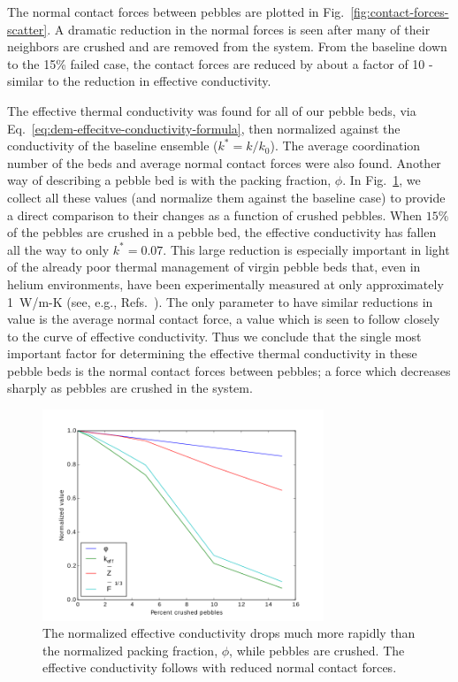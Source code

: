 The normal contact forces between pebbles are plotted in Fig.~\ref{fig:contact-forces-scatter}. A dramatic reduction in the normal forces is seen after many of their neighbors are crushed and are removed from the system. From the baseline down to the 15\% failed case, the contact forces are reduced by about a factor of 10 - similar to the reduction in effective conductivity.

The effective thermal conductivity was found for all of our pebble beds, via Eq.~\ref{eq:dem-effecitve-conductivity-formula}, then normalized against the conductivity of the baseline ensemble ($k^* = k/k_\text{0}$). The average coordination number of the beds and average normal contact forces were also found. Another way of describing a pebble bed is with the packing fraction, $\phi$. In Fig.~\ref{fig:packing-fraction}, we collect all these values (and normalize them against the baseline case) to provide a direct comparison to their changes as a function of crushed pebbles. When $15\%$ of the pebbles are crushed in a pebble bed, the effective conductivity has fallen all the way to only $k^*=0.07$. This large reduction is especially important in light of the already poor thermal management of virgin pebble beds that, even in helium environments, have been experimentally measured at only approximately 1~W/m-K (see, { e.g.}, Refs.~\cite{Reimann:2002mi, Piazza2002811}). The only parameter to have similar reductions in value is the average normal contact force, a value which is seen to follow closely to the curve of effective conductivity. Thus we conclude that the single most important factor for determining the effective thermal conductivity in these pebble beds is the normal contact forces between pebbles; a force which decreases sharply as pebbles are crushed in the system.

\begin{figure}[!ht]
	\centering
	\includegraphics[width=0.75\textwidth]{chapters/figures/kEff_packingFraction}
	\caption{The normalized effective conductivity drops much more rapidly than the normalized packing fraction, $\phi$, while pebbles are crushed. The effective conductivity follows with reduced normal contact forces.}
\label{fig:packing-fraction}
\end{figure}

